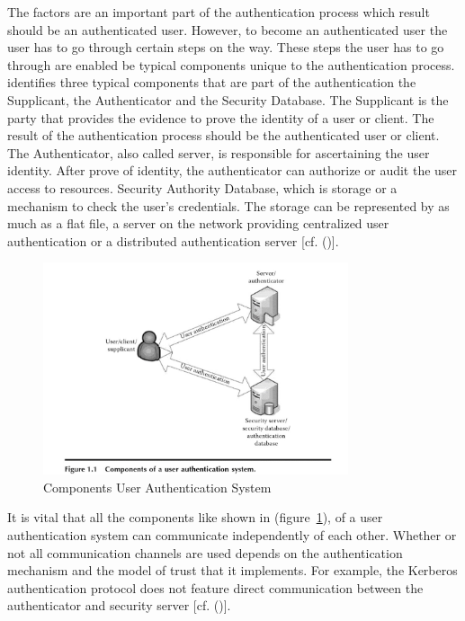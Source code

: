 The factors are an important part of the authentication process which result should be an authenticated user. However, to become an authenticated user the user has to go through certain steps on the way. These steps the user has to go through are enabled be typical components unique to the authentication process. \cite{Todorov:2007:MUI} identifies three typical components that are part of the authentication the Supplicant, the Authenticator and the Security Database. The Supplicant is the party that provides the evidence to prove the identity of a user or client. The result of the authentication process should be the authenticated user or client. The Authenticator, also called server, is responsible for ascertaining the user identity. After prove of identity, the authenticator can authorize or audit the user access to resources. Security Authority Database, which is storage or  a mechanism to check the user's credentials. The storage can be represented by as much as a flat file, a server on the network providing centralized user authentication or a distributed authentication server [cf. (\cite{Todorov:2007:MUI})]. 

\begin{figure}[h]
	\centering
	\includegraphics[width=0.8\textwidth]{images/componentsUserAuthenticationSystem}
	\caption[Componets Authentication]{Components User Authentication System}
	\label{fig:componentsuserauthenticationsystem}
\end{figure}


It is vital that all the components like shown in (figure~\ref{fig:componentsuserauthenticationsystem}), of a user authentication system can communicate independently of each other. Whether or not all communication channels are used depends on the authentication mechanism and the model of trust that it implements. For example, the Kerberos authentication protocol does not feature direct communication between the authenticator and security server [cf. (\cite{Todorov:2007:MUI})]. 

